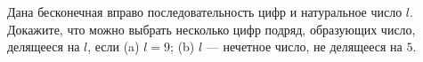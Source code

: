 Дана бесконечная вправо последовательность цифр и натуральное число $l$. Докажите, что можно выбрать несколько цифр подряд, образующих число, делящееся на $l$, если (a) $l = 9$; (b) $l$ --- нечетное число, не делящееся на $5$.